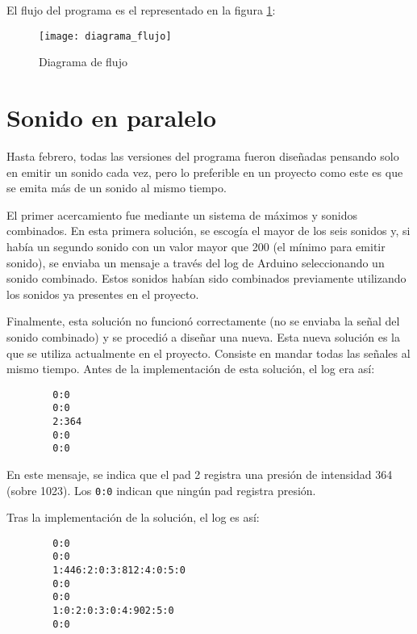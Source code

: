         El flujo del programa es el representado en la figura \ref{fig:DiagramaFlujo}:

        \newpage

        \begin{figure}[ht]
            \centering
            \texttt{[image: diagrama\_flujo]}
            \caption{Diagrama de flujo\label{fig:DiagramaFlujo}}
        \end{figure}


    \section{Sonido en paralelo} %
    \label{sec:SonidoEnParalelo}

        Hasta febrero, todas las versiones del programa fueron diseñadas pensando solo en emitir un sonido cada vez,
        pero lo preferible en un proyecto como este es que se emita más de un sonido al mismo tiempo.

        El primer acercamiento fue mediante un sistema de máximos y sonidos combinados. En esta primera solución, se
        escogía el mayor de los seis sonidos y, si había un segundo sonido con un valor mayor que 200 (el mínimo para
        emitir sonido), se enviaba un mensaje a través del log de Arduino seleccionando un sonido combinado. Estos
        sonidos habían sido combinados previamente utilizando los sonidos ya presentes en el proyecto.

        Finalmente, esta solución no funcionó correctamente (no se enviaba la señal del sonido combinado) y se procedió
        a diseñar una nueva. Esta nueva solución es la que se utiliza actualmente en el proyecto. Consiste en mandar
        todas las señales al mismo tiempo. Antes de la implementación de esta solución, el log era así:

        \begin{verbatim}
        0:0
        0:0
        2:364
        0:0
        0:0
        \end{verbatim}

        En este mensaje, se indica que el pad 2 registra una presión de intensidad 364 (sobre 1023). Los \texttt{0:0}
        indican que ningún pad registra presión.

        Tras la implementación de la solución, el log es así:

        \begin{verbatim}
        0:0
        0:0
        1:446:2:0:3:812:4:0:5:0
        0:0
        0:0
        1:0:2:0:3:0:4:902:5:0
        0:0
        \end{verbatim}

